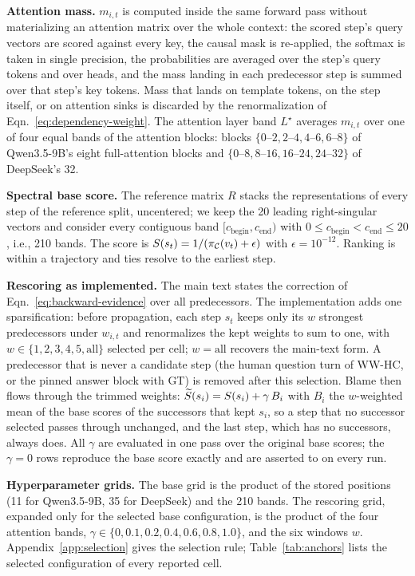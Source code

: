 \textbf{Attention mass.}
$m_{i,t}$ is computed inside the same forward pass without materializing an
attention matrix over the whole context: the scored step's query vectors are scored
against every key, the causal mask is re-applied, the softmax is taken in single
precision, the probabilities are averaged over the step's query tokens and over
heads, and the mass landing in each predecessor step is summed over that step's key
tokens. Mass that lands on template tokens, on the step itself, or on attention
sinks is discarded by the renormalization of Eqn.~\ref{eq:dependency-weight}. The
attention layer band $L^\star$ averages $m_{i,t}$ over one of four equal bands of
the attention blocks: blocks $\{0\text{--}2, 2\text{--}4, 4\text{--}6, 6\text{--}8\}$ of
Qwen3.5-9B's eight full-attention blocks and $\{0\text{--}8, 8\text{--}16,
16\text{--}24, 24\text{--}32\}$ of DeepSeek's 32.

\textbf{Spectral base score.}
The reference matrix $R$ stacks the representations of every step of the reference
split, uncentered; we keep the 20 leading right-singular vectors and consider every
contiguous band $[c_{\mathrm{begin}}, c_{\mathrm{end}})$ with $0 \le c_{\mathrm{begin}}
< c_{\mathrm{end}} \le 20$, i.e., 210 bands. The score is
$S(s_t)=1/(\pi_{\mathcal{C}}(v_t)+\epsilon)$ with $\epsilon=10^{-12}$. Ranking is
within a trajectory and ties resolve to the earliest step.

\textbf{Rescoring as implemented.}
The main text states the correction of Eqn.~\ref{eq:backward-evidence} over all
predecessors. The implementation adds one sparsification: before propagation, each
step $s_t$ keeps only its $w$ strongest predecessors under $w_{i,t}$ and renormalizes
the kept weights to sum to one, with $w \in \{1,2,3,4,5,\text{all}\}$ selected per
cell; $w=\text{all}$ recovers the main-text form. A predecessor that is never a
candidate step (the human question turn of WW-HC, or the pinned answer block with
GT) is removed after this selection. Blame then flows through the trimmed weights:
$\widetilde{S}(s_i)=S(s_i)+\gamma\,B_i$ with $B_i$ the $w$-weighted mean of the base
scores of the successors that kept $s_i$, so a step that no successor selected passes
through unchanged, and the last step, which has no successors, always does. All
$\gamma$ are evaluated in one pass over the original base scores; the $\gamma=0$
rows reproduce the base score exactly and are asserted to on every run.

\textbf{Hyperparameter grids.}
The base grid is the product of the stored positions (11 for Qwen3.5-9B, 35 for
DeepSeek) and the 210 bands. The rescoring grid, expanded only for the selected base
configuration, is the product of the four attention bands, $\gamma \in \{0, 0.1, 0.2,
0.4, 0.6, 0.8, 1.0\}$, and the six windows $w$. Appendix~\ref{app:selection} gives
the selection rule; Table~\ref{tab:anchors} lists the selected configuration of
every reported cell.

